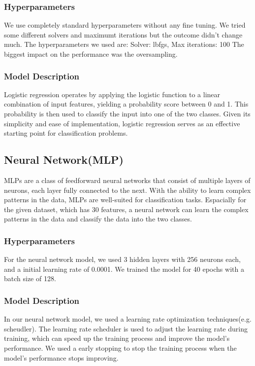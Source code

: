 \documentclass[a4, 10 pt, conference]{ieeeconf}  %
\begin{document}
\subsubsection{Hyperparameters}
We use completely standard hyperparameters without any fine tuning.
We tried some different solvers and maximumt iterations but the outcome didn't change much.
The hyperparameters we used are:
Solver: lbfgs, Max iterations: 100
The biggest impact on the performance was the oversampling.

\subsubsection{Model Description}
Logistic regression operates by applying the logistic function to a linear combination of input features, yielding a probability score between 0 and 1.
This probability is then used to classify the input into one of the two classes. Given its simplicity and ease of implementation, logistic regression serves
as an effective starting point for classification problems.

\subsection{Neural Network(MLP)}
MLPs are a class of feedforward neural networks that consist of multiple layers of neurons, each layer fully connected to the next. With the ability to learn complex patterns
in the data, MLPs are well-suited for classification tasks. Espacially for the given dataset, which has 30 features, a neural network can learn the complex patterns in the data and classify the data into the two classes.

\subsubsection{Hyperparameters}
For the neural network model, we used 3 hidden layers with 256 neurons each, and a initial learning rate of 0.0001. We trained the model for 40 epochs with a batch size of 128.

\subsubsection{Model Description}
In our neural network model, we used a learning rate optimization techniques(e.g. scheudler). The learning rate scheduler is used to adjust the learning rate during training,
which can speed up the training process and improve the model's performance. We used a early stopping to stop the training process when the model's performance stops improving.
\end{document}
